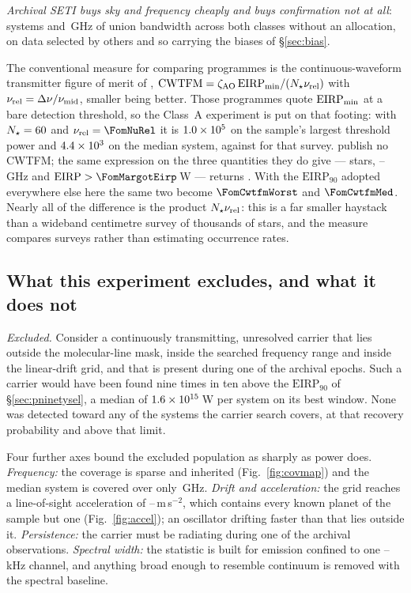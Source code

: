\emph{Archival SETI buys sky and frequency cheaply and buys confirmation not
at all}: \NSystems{} systems and \UnionGHz\,GHz of union bandwidth across both
classes without an allocation, on data selected by others and so carrying the
biases of \S\ref{sec:bias}.

The conventional measure for comparing programmes is the continuous-waveform
transmitter figure of merit of \citet{Enriquez2017},
$\mathrm{CWTFM}=\zeta_{\rm AO}\,\mathrm{EIRP}_{\rm min}/
(N_{\star}\nu_{\rm rel})$ with $\nu_{\rm rel}=\Delta\nu/\nu_{\rm mid}$,
smaller being better. Those programmes quote $\mathrm{EIRP}_{\rm min}$ at a
bare detection threshold, so the Class~A experiment is put on that footing:
with $N_{\star}=60$ and
$\nu_{\rm rel}=\FomNuRel$ it is $1.0\times10^{5}$ on the sample's largest
threshold power and $4.4\times10^{3}$ on the median system, against
\FomLitEnriquez{} for that survey. \citet{Margot2023} publish no
CWTFM; the same expression on the three quantities they do give
--- \FomMargotN{} stars, \FomMargotLo--\FomMargotHi\,GHz and
$\mathrm{EIRP}>\FomMargotEirp$\,W --- returns \FomLitMargot.
With the $\mathrm{EIRP}_{90}$ adopted
everywhere else here the same two become $\FomCwtfmWorst$ and
$\FomCwtfmMed$. Nearly all of
the difference is the product $N_{\star}\nu_{\rm rel}$: this is a far smaller
haystack than a wideband centimetre survey of thousands of stars, and the
measure compares surveys rather than estimating occurrence rates.

\subsection{What this experiment excludes, and what it does not}
\label{sec:excludes}

\noindent\emph{Excluded.} Consider a continuously transmitting, unresolved
carrier that lies outside the molecular-line mask, inside the searched
frequency range and inside the linear-drift grid, and that is present during
one of the archival epochs. Such a carrier would have been found nine times
in ten above the $\mathrm{EIRP}_{90}$ of \S\ref{sec:pninetysel}, a median of
$1.6\times10^{15}$\,W per system on its best window. None was detected
toward any of the \NSysClassA{} systems the carrier search covers, at that
recovery probability and above that limit.

Four further axes bound the excluded population as sharply as power does.
\emph{Frequency:} the coverage is sparse and inherited (Fig.~\ref{fig:covmap})
and the median system is covered over only \SysUnionAMed\,GHz. \emph{Drift and
acceleration:} the grid reaches a line-of-sight acceleration of
\AccelCeilMed--\AccelCeilMax\,m\,s$^{-2}$, which contains every known planet
of the sample but one (Fig.~\ref{fig:accel}); an oscillator drifting faster
than that lies outside it. \emph{Persistence:} the carrier must be radiating
during one of the archival observations. \emph{Spectral width:} the statistic
is built for emission confined to one \ChanLoA--\ChanHiA\,kHz channel, and
anything broad enough to resemble continuum is removed with the spectral
baseline.

